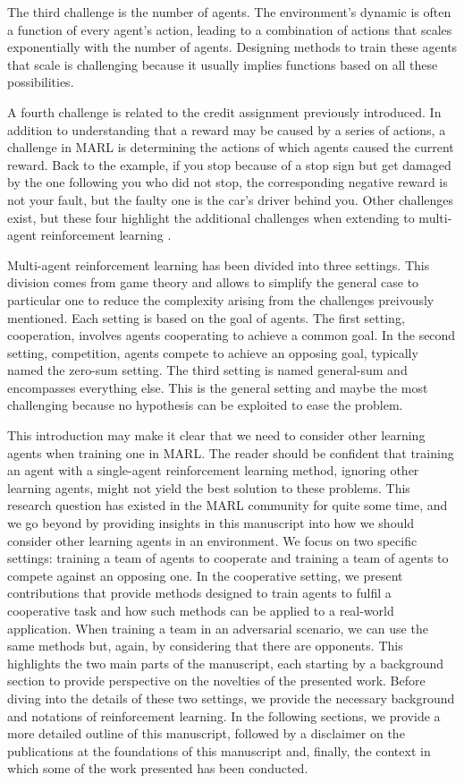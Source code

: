 The third challenge is the number of agents.
The environment's dynamic is often a function of every agent's action, leading to a combination of actions that scales exponentially with the number of agents.
Designing methods to train these agents that scale is challenging because it usually implies functions based on all these possibilities.

A fourth challenge is related to the credit assignment previously introduced.
In addition to understanding that a reward may be caused by a series of actions, a challenge in MARL is determining the actions of which agents caused the current reward.
Back to the example, if you stop because of a stop sign but get damaged by the one following you who did not stop, the corresponding negative reward is not your fault, but the faulty one is the car's driver behind you.
Other challenges exist, but these four highlight the additional challenges when extending to multi-agent reinforcement learning \cite{marl-book}.

Multi-agent reinforcement learning has been divided into three settings.
This division comes from game theory and allows to simplify the general case to particular one to reduce the complexity arising from the challenges preivously mentioned.
Each setting is based on the goal of agents.
The first setting, cooperation, involves agents cooperating to achieve a common goal.
In the second setting, competition, agents compete to achieve an opposing goal, typically named the zero-sum setting.
The third setting is named general-sum and encompasses everything else.
This is the general setting and maybe the most challenging because no hypothesis can be exploited to ease the problem.

This introduction may make it clear that we need to consider other learning agents when training one in MARL.
The reader should be confident that training an agent with a single-agent reinforcement learning method, ignoring other learning agents, might not yield the best solution to these problems.
This research question has existed in the MARL community for quite some time, and we go beyond by providing insights in this manuscript into how we should consider other learning agents in an environment.
We focus on two specific settings: training a team of agents to cooperate and training a team of agents to compete against an opposing one.
In the cooperative setting, we present contributions that provide methods designed to train agents to fulfil a cooperative task and how such methods can be applied to a real-world application.
When training a team in an adversarial scenario, we can use the same methods but, again, by considering that there are opponents.
This highlights the two main parts of the manuscript, each starting by a background section to provide perspective on the novelties of the presented work.
Before diving into the details of these two settings, we provide the necessary background and notations of reinforcement learning.
In the following sections, we provide a more detailed outline of this manuscript, followed by a disclaimer on the publications at the foundations of this manuscript and, finally, the context in which some of the work presented has been conducted.

